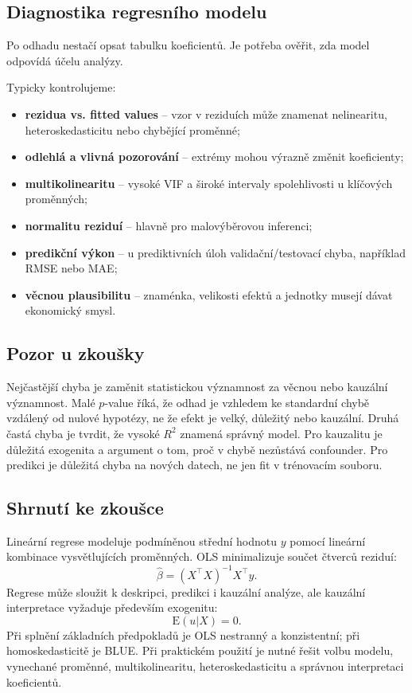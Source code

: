 \subsection{Diagnostika regresního modelu}

Po odhadu nestačí opsat tabulku koeficientů. Je potřeba ověřit, zda model odpovídá účelu analýzy.

Typicky kontrolujeme:
\begin{itemize}
    \item \textbf{rezidua vs. fitted values} -- vzor v reziduích může znamenat nelinearitu,
    heteroskedasticitu nebo chybějící proměnné;
    \item \textbf{odlehlá a vlivná pozorování} -- extrémy mohou výrazně změnit koeficienty;
    \item \textbf{multikolinearitu} -- vysoké VIF a široké intervaly spolehlivosti u klíčových
    proměnných;
    \item \textbf{normalitu reziduí} -- hlavně pro malovýběrovou inferenci;
    \item \textbf{predikční výkon} -- u prediktivních úloh validační/testovací chyba, například RMSE
    nebo MAE;
    \item \textbf{věcnou plausibilitu} -- znaménka, velikosti efektů a jednotky musejí dávat ekonomický
    smysl.
\end{itemize}

\subsection{Pozor u zkoušky}

Nejčastější chyba je zaměnit statistickou významnost za věcnou nebo kauzální významnost. Malé
$p$-value říká, že odhad je vzhledem ke standardní chybě vzdálený od nulové hypotézy, ne že efekt je
velký, důležitý nebo kauzální. Druhá častá chyba je tvrdit, že vysoké $R^2$ znamená správný model.
Pro kauzalitu je důležitá exogenita a argument o tom, proč v chybě nezůstává confounder. Pro predikci je
důležitá chyba na nových datech, ne jen fit v trénovacím souboru.

\subsection{Shrnutí ke zkoušce}

Lineární regrese modeluje podmíněnou střední hodnotu $y$ pomocí lineární kombinace vysvětlujících
proměnných. OLS minimalizuje součet čtverců reziduí:
\[
\hat\beta=(X^\top X)^{-1}X^\top y.
\]
Regrese může sloužit k deskripci, predikci i kauzální analýze, ale kauzální interpretace vyžaduje především
exogenitu:
\[
\mathrm{E}(u|X)=0.
\]
Při splnění základních předpokladů je OLS nestranný a konzistentní; při homoskedasticitě je BLUE.
Při praktickém použití je nutné řešit volbu modelu, vynechané proměnné, multikolinearitu,
heteroskedasticitu a správnou interpretaci koeficientů.

